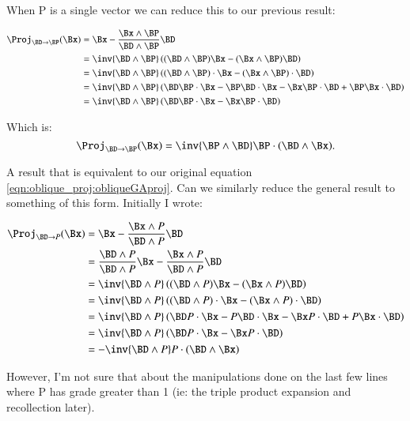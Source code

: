 When P is a single vector we can reduce this to our previous result:

\begin{align*}
\Proj_{\BD \rightarrow \BP}(\Bx) 
&= \Bx - \frac{\Bx \wedge \BP}{\BD \wedge \BP} \BD \\
&= \inv{\BD \wedge \BP} \left((\BD \wedge \BP)\Bx - (\Bx \wedge \BP) \BD \right) \\
&= \inv{\BD \wedge \BP} \left( (\BD \wedge \BP) \cdot \Bx - (\Bx \wedge \BP)  \cdot \BD \right) \\
&= \inv{\BD \wedge \BP} \left( \BD \BP \cdot \Bx -\BP \BD \cdot \Bx -\Bx \BP \cdot \BD +\BP \Bx \cdot \BD \right) \\
&= \inv{\BD \wedge \BP} \left( \BD \BP \cdot \Bx -\Bx \BP \cdot \BD \right) \\
\end{align*}

Which is:
\begin{equation}\label{eqn:oblique_proj:followup}
\Proj_{\BD \rightarrow \BP}(\Bx) 
= \inv{\BP \wedge \BD} \BP \cdot ( \BD \wedge \Bx ).
\end{equation}

A result that is equivalent to our original equation \ref{eqn:oblique_proj:obliqueGAproj}.  Can we similarly reduce the general result to something of this form.  Initially I wrote:

\begin{align*}
\Proj_{\BD \rightarrow P}(\Bx) 
&= \Bx - \frac{\Bx \wedge P}{\BD \wedge P} \BD \\
&= \frac{\BD \wedge P}{\BD \wedge P} \Bx - \frac{\Bx \wedge P}{\BD \wedge P} \BD \\
&= \inv{\BD \wedge P} \left( (\BD \wedge P) \Bx - (\Bx \wedge P) \BD \right) \\
&= \inv{\BD \wedge P} \left( (\BD \wedge P) \cdot \Bx - (\Bx \wedge P) \cdot \BD \right) \\
&= \inv{\BD \wedge P} \left( \BD P \cdot \Bx -P \BD \cdot \Bx - \Bx P \cdot \BD + P \Bx \cdot \BD \right) \\
&= \inv{\BD \wedge P} \left( \BD P \cdot \Bx - \Bx P \cdot \BD \right) \\ 
&= -\inv{\BD \wedge P} P \cdot (\BD \wedge \Bx ) \\
\end{align*}

However, I'm not sure that about the manipulations done on the last few lines where P has grade greater than 1 (ie: the triple product expansion and recollection later).


